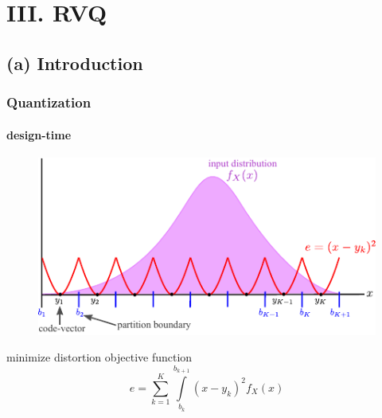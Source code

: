 \section{III. RVQ}
\subsection{(a) Introduction}
\begin{frame}
\frametitle{Quantization}
\framesubtitle{design-time}
\logoCSIPCPL\mypagenum
\begin{figure}				
\includegraphics[width=1.0\textwidth]{thesis/Quantization_design_time.pdf}
\end{figure}
minimize distortion objective function
\begin{equation*}
e=\sum\limits_{k=1}^{K} \int\limits_{b_k}^{b_{k+1}}(x-y_k)^2f_X(x)
\end{equation*}
\end{frame}




